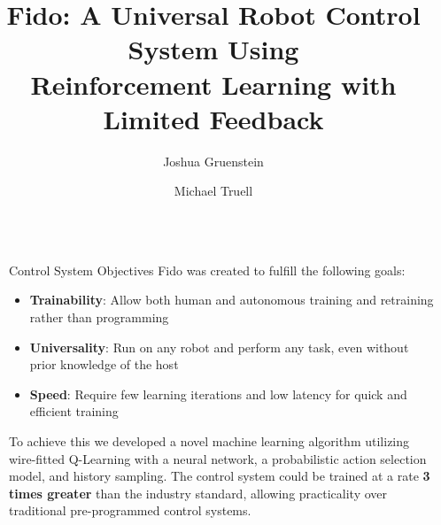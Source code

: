 \documentclass[final]{beamer}
\title{Fido: A Universal Robot Control System Using\\Reinforcement Learning with Limited Feedback}
\author{\LARGE Joshua Gruenstein \and Michael Truell}
\institute{\mbox{}}
\newlength{\sepwid}
\newlength{\onecolwid}
\begin{document}
\setlength{\belowcaptionskip}{2ex}
\setlength\belowdisplayshortskip{2ex}

\begin{frame}[t]
\begin{columns}[t]

\begin{column}{\sepwid}\end{column}
\begin{column}{\onecolwid}

	\begin{alertblock}{Control System Objectives}
		Fido was created to fulfill the following goals:
		\begin{itemize}
			\item \textbf{Trainability}: Allow both human and autonomous training and retraining rather than programming
			\item \textbf{Universality}: Run on any robot and perform any task, even without prior knowledge of the host
			\item \textbf{Speed}: Require few learning iterations and low latency for quick and efficient training
		\end{itemize}
		To achieve this we developed a novel machine learning algorithm utilizing wire-fitted Q-Learning with a neural network, a probabilistic action selection model, and history sampling.  The control system could be trained at a rate \textbf{3 times greater} than the industry standard, allowing practicality over traditional pre-programmed control systems.
	\end{alertblock}


\end{column}
\end{columns}
\end{frame}
\end{document}
